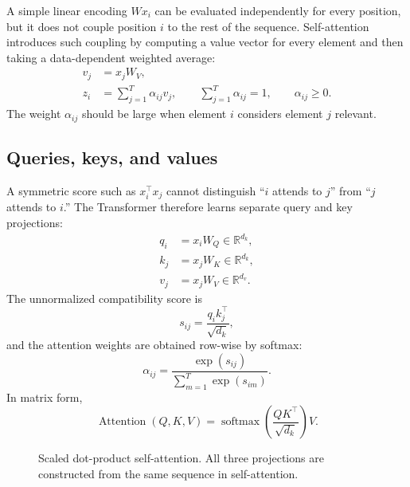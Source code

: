 \documentclass[11pt]{article}
\newcommand{\R}{\mathbb{R}}
\newcommand{\softmax}{\operatorname{softmax}}
\begin{document}
A simple linear encoding $W x_i$ can be evaluated independently for every position, but it does not couple position $i$ to the rest of the sequence. Self-attention introduces such coupling by computing a value vector for every element and then taking a data-dependent weighted average:
\begin{align}
  v_j &= x_j W_V, \\
  z_i &= \sum_{j=1}^{T} \alpha_{ij} v_j,
  \qquad \sum_{j=1}^{T}\alpha_{ij}=1,
  \qquad \alpha_{ij}\ge 0.
\end{align}
The weight $\alpha_{ij}$ should be large when element $i$ considers element $j$ relevant.

\subsection{Queries, keys, and values}

A symmetric score such as $x_i^\top x_j$ cannot distinguish ``$i$ attends to $j$'' from ``$j$ attends to $i$.'' The Transformer therefore learns separate query and key projections:
\begin{align}
  q_i &= x_i W_Q \in \R^{d_k}, \\
  k_j &= x_j W_K \in \R^{d_k}, \\
  v_j &= x_j W_V \in \R^{d_v}.
\end{align}
The unnormalized compatibility score is
\begin{equation}
  s_{ij}=\frac{q_i k_j^\top}{\sqrt{d_k}},
\end{equation}
and the attention weights are obtained row-wise by softmax:
\begin{equation}
  \alpha_{ij}
  =\frac{\exp(s_{ij})}{\sum_{m=1}^{T}\exp(s_{im})}.
\end{equation}
In matrix form,
\begin{equation}
\label{eq:scaled_attention}
  \operatorname{Attention}(Q,K,V)
  =\softmax\!\left(\frac{QK^\top}{\sqrt{d_k}}\right)V.
\end{equation}

\begin{figure}[htbp]
\centering
{}
\caption{Scaled dot-product self-attention. All three projections are constructed from the same sequence in self-attention.}
\label{fig:self_attention}
\end{figure}
\end{document}

